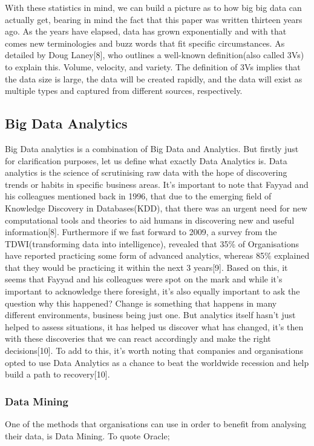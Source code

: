 \documentclass[10pt,journal,compsoc]{IEEEtran}
\begin{document}
With these statistics in mind, we can build a picture as to how big big data can actually get, bearing in mind the fact that this paper was written thirteen years ago. As the years have elapsed, data has grown exponentially and with that comes new terminologies and buzz words that fit specific circumstances. As detailed by Doug Laney[8], who outlines a well-known definition(also called 3Vs) to explain this. Volume, velocity, and variety. The definition of 3Vs implies that the data size is large, the data will be created rapidly, and the data will exist as multiple types and captured from different sources, respectively.

\subsection{Big Data Analytics}
Big Data analytics is a combination of Big Data and Analytics. But firstly just for clarification purposes, let us define what exactly Data Analytics is. Data analytics is the science of scrutinising raw data with the hope of discovering trends or habits in specific business areas. It's important to note that Fayyad and his colleagues mentioned back in 1996, that due to the emerging field of Knowledge Discovery in Databases(KDD), that there was an urgent need for new computational tools and theories to aid humans in discovering new and useful information[8]. Furthermore if we fast forward to 2009, a survey from the TDWI(transforming data into intelligence), revealed that 35\% of Organisations have reported practicing some form of advanced analytics, whereas 85\% explained that they would be practicing it within the next 3 years[9]. Based on this, it seems that Fayyad and his colleagues were spot on the mark and while it's important to acknowledge there foresight, it's also equally important to ask the question why this happened? Change is something that happens in many different environments, business being just one. But analytics itself hasn't just helped to assess situations, it has helped us discover what has changed, it's then with these discoveries that we can react accordingly and make the right decisions[10]. To add to this, it's worth noting that companies and organisations opted to use Data Analytics as a chance to beat the worldwide recession and help build a path to recovery[10].

\subsubsection{Data Mining}
One of the methods that organisations can use in order to benefit from analysing their data, is Data Mining. To quote Oracle;
\end{document}
